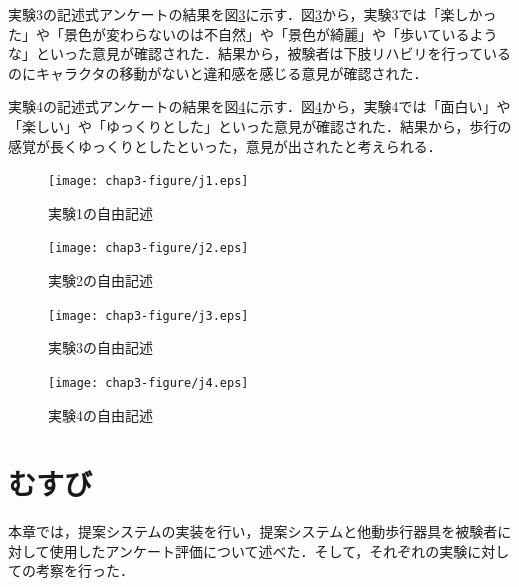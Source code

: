実験3の記述式アンケートの結果を図\ref{fig:j-3}に示す．図\ref{fig:j-3}から，実験3では「楽しかった」や「景色が変わらないのは不自然」や「景色が綺麗」や「歩いているような」といった意見が確認された．結果から，被験者は下肢リハビリを行っているのにキャラクタの移動がないと違和感を感じる意見が確認された．

実験4の記述式アンケートの結果を図\ref{fig:j-4}に示す．図\ref{fig:j-4}から，実験4では「面白い」や「楽しい」や「ゆっくりとした」といった意見が確認された．結果から，歩行の感覚が長くゆっくりとしたといった，意見が出されたと考えられる．

\begin{figure}[!tbp]
	\centering
			\texttt{[image: chap3-figure/j1.eps]}
	\caption{実験1の自由記述}
	\label{fig:j-1}
\end{figure}
\begin{figure}[!tbp]
	\centering
			\texttt{[image: chap3-figure/j2.eps]}
	\caption{実験2の自由記述}
	\label{fig:j-2}
\end{figure}
\begin{figure}[!tbp]
	\centering
			\texttt{[image: chap3-figure/j3.eps]}
	\caption{実験3の自由記述}
	\label{fig:j-3}
\end{figure}
\begin{figure}[!tbp]
	\centering
			\texttt{[image: chap3-figure/j4.eps]}
	\caption{実験4の自由記述}
	\label{fig:j-4}
\end{figure}

\section{むすび}
本章では，提案システムの実装を行い，提案システムと他動歩行器具を被験者に対して使用したアンケート評価について述べた．そして，それぞれの実験に対しての考察を行った．

